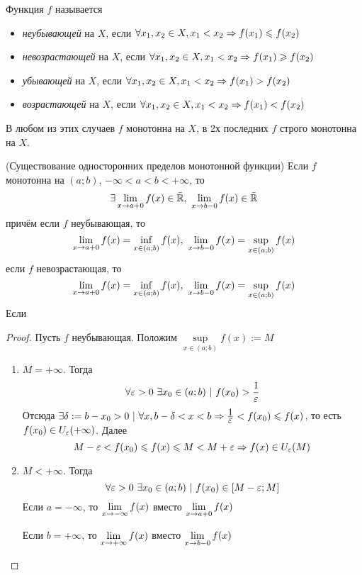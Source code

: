 \begin{definition}
	Функция $f$ называется
	\begin{itemize}
		\item \textit{неубывающей} на $X$, если $\forall x_1, x_2 \in X, x_1 < x_2 \Rightarrow f(x_1) \leqslant f(x_2)$
		\item \textit{невозрастающей} на $X$, если $\forall x_1, x_2 \in X, x_1 < x_2 \Rightarrow f(x_1) \geqslant f(x_2)$
		\item \textit{убывающей} на $X$, если $\forall x_1, x_2 \in X, x_1 < x_2 \Rightarrow f(x_1) > f(x_2)$
		\item \textit{возрастающей} на $X$, если $\forall x_1, x_2 \in X, x_1 < x_2 \Rightarrow f(x_1) < f(x_2)$
	\end{itemize}
	В любом из этих случаев $f$ монотонна на $X$, в 2х последних $f$ строго монотонна на $X$.
\end{definition}

\begin{theorem} (Существование односторонних пределов монотонной функции)
	Если $f$ монотонна на $(a; b)$, $-\infty < a < b < +\infty$, то
	$$
		\exists \lim\limits_{x \to a+0} f(x) \in \bar{\mathbb{R}},\ \lim\limits_{x \to b-0} f(x) \in \bar{\mathbb{R}}
	$$
	причём если $f$ неубывающая, то
	$$
		\lim\limits_{x \to a+0} f(x) = \inf\limits_{x \in (a; b)} f(x),\ \lim\limits_{x \to b-0} f(x) = \sup\limits_{x \in (a; b)} f(x)
	$$
	если $f$ невозрастающая, то
	$$
		\lim\limits_{x \to a+0} f(x) = \inf\limits_{x \in (a; b)} f(x),\ \lim\limits_{x \to b-0} f(x) = \sup\limits_{x \in (a; b)} f(x)
	$$
	Если 
\end{theorem}

\begin{proof}
	Пусть $f$ неубывающая. Положим $\sup\limits_{x \in (a; b)} f(x) := M$
	\begin{enumerate}
		\item $M = +\infty$. Тогда
		$$
			\forall \varepsilon > 0\ \exists x_0 \in (a; b)\ |\ f(x_0) > \frac{\displaystyle 1}{\displaystyle \varepsilon}
		$$
		Отсюда $\exists \delta := b - x_0 > 0\ |\ \forall x, b - \delta < x < b \Rightarrow \frac{\displaystyle 1}{\displaystyle \varepsilon} < f(x_0) \leqslant f(x)$, то есть $f(x_0) \in U_{\varepsilon}(+\infty)$.
		Далее
		$$
			M - \varepsilon < f(x_0) \leqslant f(x) \leqslant M < M + \varepsilon \Rightarrow f(x) \in U_{\varepsilon}(M)
		$$
		
		\item $M < +\infty$. Тогда
		$$
			\forall \varepsilon > 0\ \exists x_0 \in (a; b)\ |\ f(x_0) \in [M - \varepsilon; M]
		$$
		Если $a = -\infty$, то $\lim\limits_{x \to -\infty} f(x)$ вместо $\lim\limits_{x \to a+0} f(x)$
		
		Если $b = +\infty$, то $\lim\limits_{x \to +\infty} f(x)$ вместо $\lim\limits_{x \to b-0} f(x)$
		
		
	\end{enumerate}
\end{proof}

